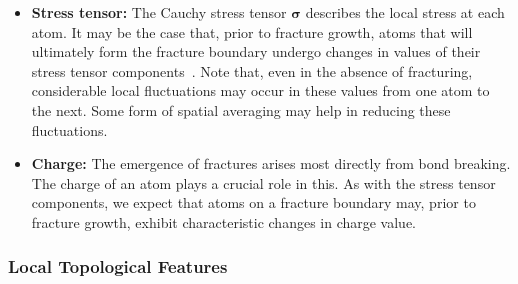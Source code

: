 \begin{itemize}
    \item\textbf{Stress tensor:} The Cauchy stress tensor $\boldsymbol{\sigma}$ describes the local stress at each atom.  It may be the case that, prior to fracture growth, atoms that will ultimately form the fracture boundary undergo changes in values of their stress tensor components~\cite{elastic_fracture}. Note that, even in the absence of fracturing, considerable local fluctuations may occur in these values from one atom to the next.  Some form of spatial averaging may help in reducing these fluctuations.

    \item\textbf{Charge:} The emergence of fractures arises most directly from bond breaking.  The charge of an atom plays a crucial role in this.  As with the stress tensor components, we expect that atoms on a fracture boundary may, prior to fracture growth, exhibit characteristic changes in charge value.
\end{itemize}

\subsubsection{Local Topological Features}

